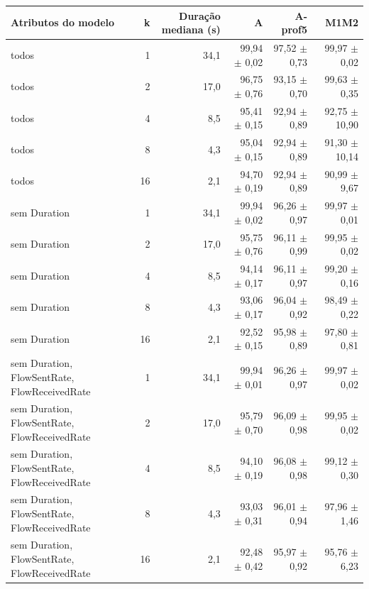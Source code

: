 \begin{tabular}{lrrrrr}
\hline
\textbf{Atributos do modelo} & \textbf{k} & \textbf{Duração mediana (s)} & \textbf{A} & \textbf{A-prof5} & \textbf{M1M2} \\ \hline
todos & 1 & 34,1 & 99,94 $\pm$ 0,02 & 97,52 $\pm$ 0,73 & 99,97 $\pm$ 0,02 \\
todos & 2 & 17,0 & 96,75 $\pm$ 0,76 & 93,15 $\pm$ 0,70 & 99,63 $\pm$ 0,35 \\
todos & 4 & 8,5 & 95,41 $\pm$ 0,15 & 92,94 $\pm$ 0,89 & 92,75 $\pm$ 10,90 \\
todos & 8 & 4,3 & 95,04 $\pm$ 0,15 & 92,94 $\pm$ 0,89 & 91,30 $\pm$ 10,14 \\
todos & 16 & 2,1 & 94,70 $\pm$ 0,19 & 92,94 $\pm$ 0,89 & 90,99 $\pm$ 9,67 \\
\hline
sem Duration & 1 & 34,1 & 99,94 $\pm$ 0,02 & 96,26 $\pm$ 0,97 & 99,97 $\pm$ 0,01 \\
sem Duration & 2 & 17,0 & 95,75 $\pm$ 0,76 & 96,11 $\pm$ 0,99 & 99,95 $\pm$ 0,02 \\
sem Duration & 4 & 8,5 & 94,14 $\pm$ 0,17 & 96,11 $\pm$ 0,97 & 99,20 $\pm$ 0,16 \\
sem Duration & 8 & 4,3 & 93,06 $\pm$ 0,17 & 96,04 $\pm$ 0,92 & 98,49 $\pm$ 0,22 \\
sem Duration & 16 & 2,1 & 92,52 $\pm$ 0,15 & 95,98 $\pm$ 0,89 & 97,80 $\pm$ 0,81 \\
\hline
sem Duration, FlowSentRate, FlowReceivedRate & 1 & 34,1 & 99,94 $\pm$ 0,01 & 96,26 $\pm$ 0,97 & 99,97 $\pm$ 0,02 \\
sem Duration, FlowSentRate, FlowReceivedRate & 2 & 17,0 & 95,79 $\pm$ 0,70 & 96,09 $\pm$ 0,98 & 99,95 $\pm$ 0,02 \\
sem Duration, FlowSentRate, FlowReceivedRate & 4 & 8,5 & 94,10 $\pm$ 0,19 & 96,08 $\pm$ 0,98 & 99,12 $\pm$ 0,30 \\
sem Duration, FlowSentRate, FlowReceivedRate & 8 & 4,3 & 93,03 $\pm$ 0,31 & 96,01 $\pm$ 0,94 & 97,96 $\pm$ 1,46 \\
sem Duration, FlowSentRate, FlowReceivedRate & 16 & 2,1 & 92,48 $\pm$ 0,42 & 95,97 $\pm$ 0,92 & 95,76 $\pm$ 6,23 \\
\hline
\end{tabular}

